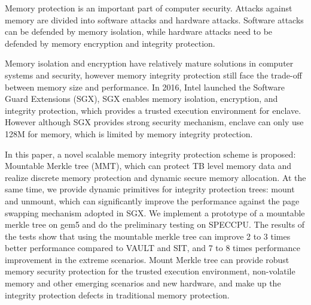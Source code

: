 \begin{enabstract}
  Memory protection is an important part of computer security. Attacks against memory are divided into software attacks and hardware attacks. Software attacks can be defended by memory isolation, while hardware attacks need to be defended by memory encryption and integrity protection.

  Memory isolation and encryption have relatively mature solutions in computer systems and security, however memory integrity protection still face the trade-off between memory size and performance. In 2016, Intel launched the Software Guard Extensions (SGX), SGX enables memory isolation, encryption, and integrity protection, which provides a trusted execution environment for enclave. However although SGX provides strong security mechanism, enclave can only use 128M for memory, which is limited by memory integrity protection.
  
  In this paper, a novel scalable memory integrity protection scheme is proposed: Mountable Merkle tree (MMT), which can protect TB level memory data and realize discrete memory protection and dynamic secure memory allocation. At the same time, we provide dynamic primitives for integrity protection trees: mount and unmount, which can significantly improve the performance against the page swapping mechanism adopted in SGX. We implement a prototype of a mountable merkle tree on gem5 and do the preliminary testing on SPECCPU. The results of the tests show that using the mountable merkle tree can improve 2 to 3 times better performance compared to VAULT and SIT, and 7 to 8 times performance improvement in the extreme scenarios. Mount Merkle tree can provide robust memory security protection for the trusted execution environment, 
  non-volatile memory and other emerging scenarios and new hardware, and make up the integrity protection defects in traditional memory protection.
\end{enabstract}
